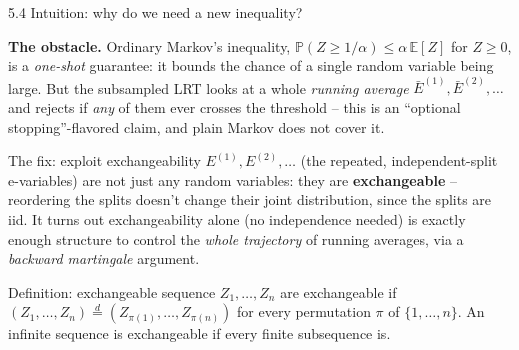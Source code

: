 \documentclass[aspectratio=169,10pt]{beamer}
\renewcommand{\P}{\mathbb{P}}
\newcommand{\E}{\mathbb{E}}
\begin{document}
\begin{frame}{5.4 Intuition: why do we need a new inequality?}

  \textbf{The obstacle.} Ordinary Markov's inequality,
  $\P(Z \ge 1/\alpha) \le \alpha\,\E[Z]$ for $Z\ge 0$, is a
  \emph{one-shot} guarantee: it bounds the chance of a single random
  variable being large. But the subsampled LRT looks at a whole
  \emph{running average} $\bar E^{(1)}, \bar E^{(2)}, \ldots$ and
  rejects if \emph{any} of them ever crosses the threshold -- this is
  an ``optional stopping''-flavored claim, and plain Markov does not
  cover it.

  \begin{block}{The fix: exploit exchangeability}
    $E^{(1)}, E^{(2)}, \ldots$ (the repeated, independent-split
    e-variables) are not just any random variables: they are
    \textbf{exchangeable} -- reordering the splits doesn't change their
    joint distribution, since the splits are iid. It turns out
    exchangeability alone (no independence needed) is exactly enough
    structure to control the \emph{whole trajectory} of running
    averages, via a \emph{backward martingale} argument.
  \end{block}

  \begin{block}{Definition: exchangeable sequence}
    $Z_1,\ldots,Z_n$ are exchangeable if $(Z_1,\ldots,Z_n) \stackrel{d}{=} (Z_{\pi(1)},\ldots,Z_{\pi(n)})$
    for every permutation $\pi$ of $\{1,\ldots,n\}$. An infinite
    sequence is exchangeable if every finite subsequence is.
  \end{block}

\end{frame}
\end{document}
